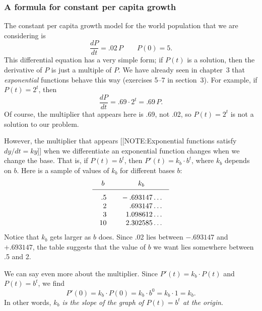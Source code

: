 \subsubsection{A formula for constant per capita growth}
\label{subsubsec:a-formula-for-constant-per-capita-growth}

The constant per capita growth model for the world population that we
are considering is
\[
\dfrac{dP}{dt} = .02\, P \qquad P(0) = 5.
\]
This differential equation has a very simple form; if $P(t)$ is a
solution, then the derivative of $P$ is just a multiple of $P$.  We
have already seen in chapter~3 that {\em exponential\/}
functions behave this way (exercises 5--7
in section~3).  For example, if $P(t) = 2^t$, then
\[
\dfrac{dP}{dt} = .69 \cdot 2^t = .69 \, P.
\]
Of course, the multiplier that appears here is .69, not .02, so $P(t)
= 2^t$ is not a solution to our problem.

\pagebreak

However, the multiplier that appears 
[[NOTE:Exponential functions satisfy $dy/dt = ky$]]
when we differentiate an exponential function changes when we change
the base.  That is, if $P(t) = b^t$, then $P'(t) = k_b \cdot b^t$,
where $k_b$ depends on $b$.  Here is a sample of values of $k_b$ for
different bases $b$: \addtolength{\arraycolsep}{4pt}
	\[
\begin{array}{cc}
	b & k_b \\[2pt] \hline
	\begin{array}{r}
	\rule{0pt}{14pt} .5 \\ 2 \\ 3 \\ 10 
	\end{array}
	&
	\begin{array}{r}
	\rule{0pt}{14pt} -.693147\ldots \\ .693147\ldots \\
		1.098612\ldots \\ 2.302585\ldots 
	\end{array}
	\end{array}
\]
	\addtolength{\arraycolsep}{-4pt}%
Notice that $k_b$ gets larger as $b$ does.  Since .02\label{k_b} lies
between $-.693147$ and $+.693147$, the table suggests that the value
of $b$ we want lies somewhere between .5 and 2.

	We can say even more about the multiplier.  Since $P'(t) = k_b \cdot P(t)$ and $P(t) = b^t$, we find
	\[
P'(0) = k_b \cdot P(0) = k_b \cdot b^0 = k_b \cdot 1
		= k_b.
\]
In other words, {\em $k_b$ is the slope of the graph of $P(t) = b^t$ at the origin}.


